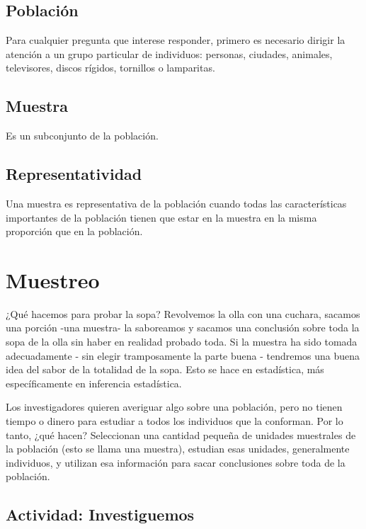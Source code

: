 \documentclass[
  letterpaper,
  DIV=11,
  numbers=noendperiod]{scrreprt}
\begin{document}
\section{Población}\label{poblaciuxf3n}

Para cualquier pregunta que interese responder, primero es necesario
dirigir la atención a un grupo particular de individuos: personas,
ciudades, animales, televisores, discos rígidos, tornillos o lamparitas.

\section{Muestra}\label{muestra}

Es un subconjunto de la población.

\section{Representatividad}\label{representatividad}

Una muestra es representativa de la población cuando todas las
características importantes de la población tienen que estar en la
muestra en la misma proporción que en la población.

\chapter{Muestreo}\label{muestreo-2}

¿Qué hacemos para probar la sopa? Revolvemos la olla con una cuchara,
sacamos una porción -una muestra- la saboreamos y sacamos una conclusión
sobre toda la sopa de la olla sin haber en realidad probado toda. Si la
muestra ha sido tomada adecuadamente - sin elegir tramposamente la parte
buena - tendremos una buena idea del sabor de la totalidad de la sopa.
Esto se hace en estadística, más específicamente en inferencia
estadística.

Los investigadores quieren averiguar algo sobre una población, pero no
tienen tiempo o dinero para estudiar a todos los individuos que la
conforman. Por lo tanto, ¿qué hacen? Seleccionan una cantidad pequeña de
unidades muestrales de la población (esto se llama una muestra),
estudian esas unidades, generalmente individuos, y utilizan esa
información para sacar conclusiones sobre toda de la población.

\section{Actividad: Investiguemos}\label{actividad-investiguemos}
\end{document}
